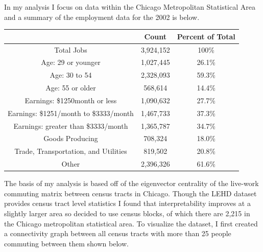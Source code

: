 \documentclass{article}
\theoremstyle{definition}
\theoremstyle{remark}
\begin{document}
In my analysis I focus on data within the Chicago Metropolitan Statistical Area and a summary of the employment data for the 2002 is below. \\
\begin{center}
 \begin{tabular}{|| c | c | c||} 
 \hline
 & Count & Percent of Total \\[0.5ex] 
 \hline\hline
 Total Jobs & 3,924,152  & 100\% \\  \hline
 Age: 29 or younger & 1,027,445 & 26.1\% \\ 
 Age: 30 to 54 & 2,328,093 & 59.3\% \\
 Age: 55 or older & 568,614 & 14.4\% \\ \hline
 Earnings: \$1250month or less & 1,090,632 & 27.7\% \\ 
 Earnings: \$1251/month to \$3333/month  & 1,467,733 & 37.3\% \\ 
 Earnings: greater than \$3333/month & 1,365,787 & 34.7\% \\ \hline
 Goods Producing  & 708,324 & 18.0\% \\ 
 Trade, Transportation, and Utilities  & 819,502 & 20.8\% \\ 
 Other  & 2,396,326 & 61.6\% \\ \hline 
\end{tabular}
\end{center}

The basis of my analysis is based off of the eigenvector centrality of the live-work commuting matrix between census tracts in Chicago.  Though the LEHD dataset provides census tract level statistics I found that interpretability improves at a slightly larger area so decided to use census blocks, of which there are 2,215 in the Chicago metropolitan statistical area. To visualize the dataset, I first created a connectivity graph between all census tracts with more than 25 people commuting between them shown below.\\
\end{document}

